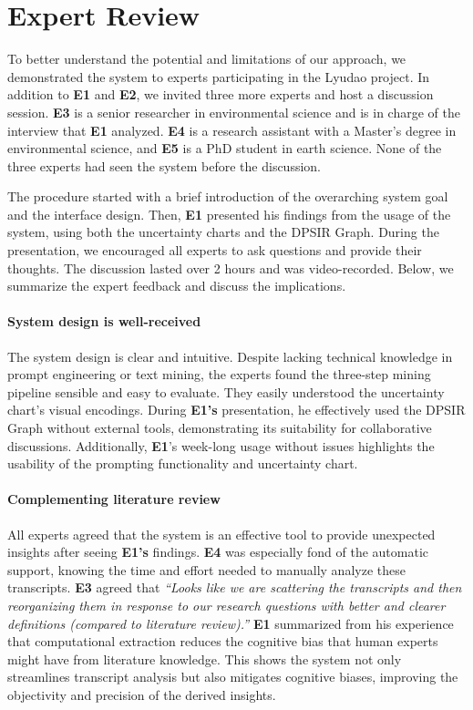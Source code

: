 \vspace*{-0.15cm}
\section{Expert Review}
To better understand the potential and limitations of our approach, we demonstrated the system to experts participating in the Lyudao project.
In addition to \textbf{E1} and \textbf{E2}, we invited three more experts and host a discussion session. \textbf{E3} is a senior researcher in environmental science and is in charge of the interview that \textbf{E1} analyzed. \textbf{E4} is a research assistant with a Master's degree in environmental science, and \textbf{E5} is a PhD student in earth science. None of the three experts had seen the system before the discussion.

The procedure started with a brief introduction of the overarching system goal and the interface design. Then, \textbf{E1} presented his findings from the usage of the system, using both the uncertainty charts and the DPSIR Graph. During the presentation, we encouraged all experts to ask questions and provide their thoughts. The discussion lasted over 2 hours and was video-recorded. Below, we summarize the expert feedback and discuss the implications.

\vspace*{-0.1cm}
\paragraph{System design is well-received}
The system design is clear and intuitive. Despite lacking technical knowledge in prompt engineering or text mining, the experts found the three-step mining pipeline sensible and easy to evaluate. They easily understood the uncertainty chart's visual encodings. During \textbf{E1's} presentation, he effectively used the DPSIR Graph without external tools, demonstrating its suitability for collaborative discussions. Additionally, \textbf{E1}'s week-long usage without issues highlights the usability of the prompting functionality and uncertainty chart.

\vspace*{-0.15cm}
\paragraph{Complementing literature review}
All experts agreed that the system is an effective tool to provide unexpected insights after seeing \textbf{E1's} findings. \textbf{E4} was especially fond of the automatic support, knowing the time and effort needed to manually analyze these transcripts. \textbf{E3} agreed that \textit{``Looks like we are scattering the transcripts and then reorganizing them in response to our research questions with better and clearer definitions (compared to literature review).''}
\textbf{E1} summarized from his experience that computational extraction reduces the cognitive bias that human experts might have from literature knowledge.
This shows the system not only streamlines transcript analysis but also mitigates cognitive biases, improving the objectivity and precision of the derived insights.

